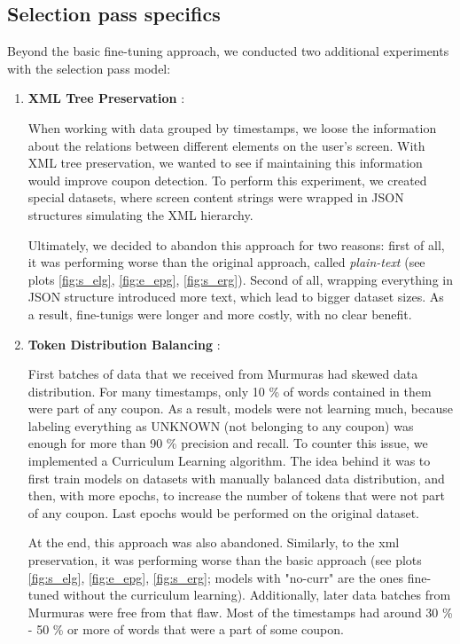 \documentclass[licencjacka,en]{pracamgr}
\begin{document}
\subsection{Selection pass specifics}
Beyond the basic fine-tuning approach, we conducted two additional experiments with the selection pass model:

\begin{enumerate}
    \item \textbf{XML Tree Preservation} \cite{JSON_code}:
    
    When working with data grouped by timestamps, we loose the information about the relations between different elements on the user's screen. With XML tree preservation, we wanted to see if maintaining this information would improve coupon detection. To perform this experiment, we created special datasets, where screen content strings were wrapped in JSON structures simulating the XML hierarchy.

    Ultimately, we decided to abandon this approach for two reasons: first of all, it was performing worse than the original approach, called \emph{plain-text} (see plots \ref{fig:s_elg}, \ref{fig:e_epg}, \ref{fig:s_erg}). Second of all, wrapping everything in JSON structure introduced more text, which lead to bigger dataset sizes. As a result, fine-tunigs were longer and more costly, with no clear benefit.
    
    \item \textbf{Token Distribution Balancing} \cite{Curriculer}:
    
    First batches of data that we received from Murmuras had skewed data distribution. For many timestamps, only 10 \% of words contained in them were part of any coupon. As a result, models were not learning much, because labeling everything as UNKNOWN (not belonging to any coupon) was enough for more than 90 \% precision and recall. To counter this issue, we implemented a Curriculum Learning algorithm. The idea behind it was to first train models on datasets with manually balanced data distribution, and then, with more epochs, to increase the number of tokens that were not part of any coupon. Last epochs would be performed on the original dataset.

    At the end, this approach was also abandoned. Similarly, to the xml preservation, it was performing worse than the basic approach (see plots \ref{fig:s_elg}, \ref{fig:e_epg}, \ref{fig:s_erg}; models with "no-curr" are the ones fine-tuned without the curriculum learning). Additionally, later data batches from Murmuras were free from that flaw. Most of the timestamps had around 30 \% {-} 50 \% or more of words that were a part of some coupon.
\end{enumerate}
\end{document}
